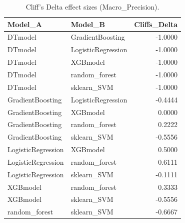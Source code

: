 \begin{table}[t]
\centering
\begin{tabular}{llr}
\toprule
Model_A & Model_B & Cliffs_Delta \\
\midrule
DTmodel & GradientBoosting & -1.0000 \\
DTmodel & LogisticRegression & -1.0000 \\
DTmodel & XGBmodel & -1.0000 \\
DTmodel & random_forest & -1.0000 \\
DTmodel & sklearn_SVM & -1.0000 \\
GradientBoosting & LogisticRegression & -0.4444 \\
GradientBoosting & XGBmodel & 0.0000 \\
GradientBoosting & random_forest & 0.2222 \\
GradientBoosting & sklearn_SVM & -0.5556 \\
LogisticRegression & XGBmodel & 0.5000 \\
LogisticRegression & random_forest & 0.6111 \\
LogisticRegression & sklearn_SVM & -0.1111 \\
XGBmodel & random_forest & 0.3333 \\
XGBmodel & sklearn_SVM & -0.5556 \\
random_forest & sklearn_SVM & -0.6667 \\
\bottomrule
\end{tabular}
\caption{Cliff's Delta effect sizes (Macro_Precision).}
\label{tab:cliffs_Macro_Precision}
\end{table}